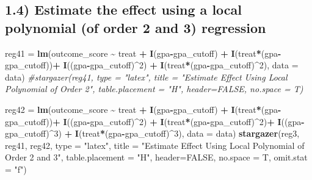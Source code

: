 \documentclass[
]{article}
\newenvironment{Shaded}{\begin{snugshade}}{\end{snugshade}}
\newcommand{\AttributeTok}[1]{\textcolor[rgb]{0.13,0.29,0.53}{#1}}
\newcommand{\CommentTok}[1]{\textcolor[rgb]{0.56,0.35,0.01}{\textit{#1}}}
\newcommand{\ConstantTok}[1]{\textcolor[rgb]{0.56,0.35,0.01}{#1}}
\newcommand{\DecValTok}[1]{\textcolor[rgb]{0.00,0.00,0.81}{#1}}
\newcommand{\FunctionTok}[1]{\textcolor[rgb]{0.13,0.29,0.53}{\textbf{#1}}}
\newcommand{\NormalTok}[1]{#1}
\newcommand{\OtherTok}[1]{\textcolor[rgb]{0.56,0.35,0.01}{#1}}
\newcommand{\SpecialCharTok}[1]{\textcolor[rgb]{0.81,0.36,0.00}{\textbf{#1}}}
\newcommand{\StringTok}[1]{\textcolor[rgb]{0.31,0.60,0.02}{#1}}
\begin{document}
\hypertarget{estimate-the-effect-using-a-local-polynomial-of-order-2-and-3-regression}{%
\subsection{1.4) Estimate the effect using a local polynomial (of order
2 and 3)
regression}\label{estimate-the-effect-using-a-local-polynomial-of-order-2-and-3-regression}}

\begin{Shaded}
\begin{Highlighting}[]
\NormalTok{reg41 }\OtherTok{=} \FunctionTok{lm}\NormalTok{(outcome\_score }\SpecialCharTok{\textasciitilde{}}\NormalTok{ treat }\SpecialCharTok{+} \FunctionTok{I}\NormalTok{(gpa}\SpecialCharTok{{-}}\NormalTok{gpa\_cutoff) }\SpecialCharTok{+} \FunctionTok{I}\NormalTok{(treat}\SpecialCharTok{*}\NormalTok{(gpa}\SpecialCharTok{{-}}\NormalTok{gpa\_cutoff))}\SpecialCharTok{+}
             \FunctionTok{I}\NormalTok{((gpa}\SpecialCharTok{{-}}\NormalTok{gpa\_cutoff)}\SpecialCharTok{\^{}}\DecValTok{2}\NormalTok{) }\SpecialCharTok{+} \FunctionTok{I}\NormalTok{(treat}\SpecialCharTok{*}\NormalTok{(gpa}\SpecialCharTok{{-}}\NormalTok{gpa\_cutoff)}\SpecialCharTok{\^{}}\DecValTok{2}\NormalTok{), }\AttributeTok{data =}\NormalTok{ data)}
\CommentTok{\#stargazer(reg41, type = "latex", title = "Estimate Effect Using Local Polynomial of Order 2", table.placement = "H", header=FALSE, no.space = T)}
\end{Highlighting}
\end{Shaded}

\begin{Shaded}
\begin{Highlighting}[]
\NormalTok{reg42 }\OtherTok{=} \FunctionTok{lm}\NormalTok{(outcome\_score }\SpecialCharTok{\textasciitilde{}}\NormalTok{ treat }\SpecialCharTok{+} \FunctionTok{I}\NormalTok{(gpa}\SpecialCharTok{{-}}\NormalTok{gpa\_cutoff) }\SpecialCharTok{+} \FunctionTok{I}\NormalTok{(treat}\SpecialCharTok{*}\NormalTok{(gpa}\SpecialCharTok{{-}}\NormalTok{gpa\_cutoff))}\SpecialCharTok{+}
             \FunctionTok{I}\NormalTok{((gpa}\SpecialCharTok{{-}}\NormalTok{gpa\_cutoff)}\SpecialCharTok{\^{}}\DecValTok{2}\NormalTok{) }\SpecialCharTok{+} \FunctionTok{I}\NormalTok{(treat}\SpecialCharTok{*}\NormalTok{(gpa}\SpecialCharTok{{-}}\NormalTok{gpa\_cutoff)}\SpecialCharTok{\^{}}\DecValTok{2}\NormalTok{)}\SpecialCharTok{+}
             \FunctionTok{I}\NormalTok{((gpa}\SpecialCharTok{{-}}\NormalTok{gpa\_cutoff)}\SpecialCharTok{\^{}}\DecValTok{3}\NormalTok{) }\SpecialCharTok{+} \FunctionTok{I}\NormalTok{(treat}\SpecialCharTok{*}\NormalTok{(gpa}\SpecialCharTok{{-}}\NormalTok{gpa\_cutoff)}\SpecialCharTok{\^{}}\DecValTok{3}\NormalTok{), }\AttributeTok{data =}\NormalTok{ data)}
\FunctionTok{stargazer}\NormalTok{(reg3, reg41, reg42, }\AttributeTok{type =} \StringTok{"latex"}\NormalTok{, }\AttributeTok{title =} \StringTok{"Estimate Effect Using Local Polynomial of Order 2 and 3"}\NormalTok{,}
          \AttributeTok{table.placement =} \StringTok{"H"}\NormalTok{, }\AttributeTok{header=}\ConstantTok{FALSE}\NormalTok{, }\AttributeTok{no.space =}\NormalTok{ T, }\AttributeTok{omit.stat =} \StringTok{"f"}\NormalTok{)}
\end{Highlighting}
\end{Shaded}
\end{document}
